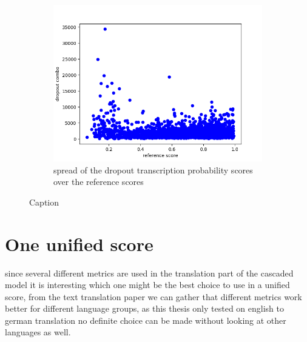 \begin{figure}
\begin{subfigure}{0.4\linewidth}
        \includegraphics[width=\textwidth]{Latex/sections/images/seamlessdropoutcombo.png}
        \caption{spread of the dropout transcription probability scores over the reference scores}
    \end{subfigure}
    \caption{Caption}
    \label{fig:enter-label}
\end{figure}

    

\section{One unified score}
since several different metrics are used in the translation part of the cascaded model it is interesting which one might be the best choice to use in a unified score, from the text translation paper \cite{fomicheva2020unsupervised} we can gather that different metrics work better for different language groups, as this thesis only tested on english to german translation no definite choice can be made without looking at other languages as well.


